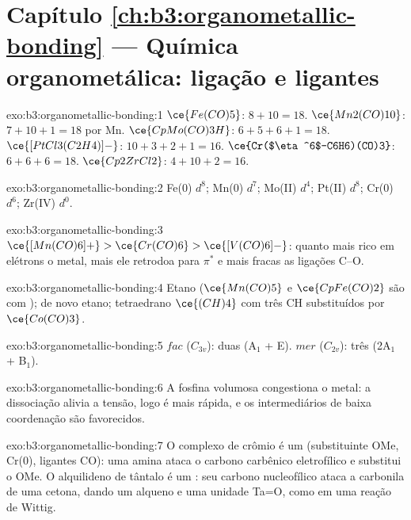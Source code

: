 \section*{Capítulo \ref{ch:b3:organometallic-bonding} --- Química organometálica: ligação e ligantes}

\begin{solution}{exo:b3:organometallic-bonding:1}
$\ce{Fe(CO)5}$: $8 + 10 = 18$. $\ce{Mn2(CO)10}$: $7 + 10 + 1 = 18$ por Mn. $\ce{CpMo(CO)3H}$: $6 + 5 + 6 + 1 =
18$. $\ce{[PtCl3(C2H4)]-}$: $10 + 3 + 2 + 1 = 16$. $\ce{Cr($\eta^6$-C6H6)(CO)3}$: $6 + 6 + 6 = 18$. $\ce{Cp2ZrCl2}$:
$4 + 10 + 2 = 16$.
\end{solution}

\begin{solution}{exo:b3:organometallic-bonding:2}
Fe(0) $d^8$; Mn(0) $d^7$; Mo(II) $d^4$; Pt(II) $d^8$; Cr(0) $d^6$; Zr(IV) $d^0$.
\end{solution}

\begin{solution}{exo:b3:organometallic-bonding:3}
$\ce{[Mn(CO)6]+} > \ce{Cr(CO)6} > \ce{[V(CO)6]-}$: quanto mais rico em elétrons o metal, mais ele
retrodoa para $\pi^*$ e mais fracas as ligações C--O.
\end{solution}

\begin{solution}{exo:b3:organometallic-bonding:4}
Etano ($\ce{Mn(CO)5}$ e $\ce{CpFe(CO)2}$ são  com ); de novo etano; tetraedrano
$\ce{(CH)4}$ com três CH substituídos por $\ce{Co(CO)3}$.
\end{solution}

\begin{solution}{exo:b3:organometallic-bonding:5}
$fac$ ($C_{3v}$): duas (A$_1$ + E). $mer$ ($C_{2v}$): três (2A$_1$ + B$_1$).
\end{solution}

\begin{solution}{exo:b3:organometallic-bonding:6}
A fosfina volumosa congestiona o metal: a dissociação alivia a tensão, logo é
mais rápida, e os intermediários de baixa coordenação são favorecidos.
\end{solution}

\begin{solution}{exo:b3:organometallic-bonding:7}
O complexo de crômio é um  (substituinte OMe, Cr(0), ligantes CO): uma
amina ataca o carbono carbênico eletrofílico e substitui o OMe. O alquilideno de
tântalo é um : seu carbono nucleofílico ataca a carbonila de uma
cetona, dando um alqueno e uma unidade Ta=O, como em uma reação de Wittig.
\end{solution}

